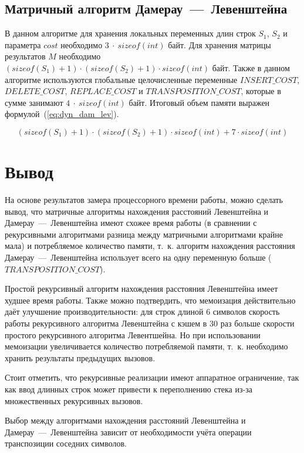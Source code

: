 \subsection{Матричный алгоритм Дамерау~---~Левенштейна}

В данном алгоритме для хранения локальных переменных длин строк $S_1$, $S_2$ и параметра $cost$ необходимо $3~\cdot~sizeof(int)$ байт. Для хранения матрицы результатов $M$ необходимо $(sizeof(S_1) + 1) \cdot (sizeof(S_2) + 1) \cdot sizeof(int)$ байт. Также в данном алгоритме используются глобальные целочисленные переменные $INSERT\_COST$, $DELETE\_COST$, $REPLACE\_COST$ и $TRANSPOSITION\_COST$, которые в сумме занимают $4~\cdot~sizeof(int)$ байт. Итоговый объем памяти выражен формулой~(\ref{eq:dyn_dam_lev}).

\begin{equation}
    \label{eq:dyn_dam_lev}
    (sizeof(S_1) + 1) \cdot (sizeof(S_2) + 1) \cdot sizeof(int) + 7 \cdot sizeof(int)
\end{equation}

\section{Вывод}

На основе результатов замера процессорного времени работы, можно сделать вывод, что матричные алгоритмы нахождения расстояний Левенштейна и Дамерау~---~Левенштейна имеют схожее время работы (в сравнении с рекурсивными алгоритмами разница между матричными алгоритмами крайне мала) и потребляемое количество памяти, т.~к. алгоритм нахождения расстояния Дамерау~---~Левенштейна использует всего на одну переменную больше ($TRANSPOSITION\_COST$). 

Простой рекурсивный алгоритм нахождения расстояния Левенштейна имеет худшее время работы. Также можно подтвердить, что мемоизация действительно даёт улучшение производительности: для строк длиной 6 символов скорость работы рекурсивного алгоритма Левенштейна с кэшем в 30 раз больше скорости простого рекурсивного алгоритма Левентшейна. Но при использовании мемоизации увеличивается количество потребляемой памяти, т.~к. необходимо хранить результаты предыдущих вызовов. 

Стоит отметить, что рекурсивные реализации имеют аппаратное ограничение, так как ввод длинных строк может привести к переполнению стека из-за множественных рекурсивных вызовов.

Выбор между алгоритмами нахождения расстояний Левенштейна и Дамерау~---~Левенштейна зависит от необходимости учёта операции транспозиции соседних символов.